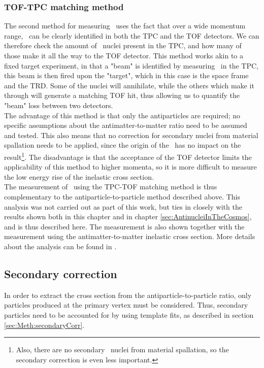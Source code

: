 \subsubsection{TOF-TPC matching method}\label{sec:TOFTPCMethod}
The second method for measuring \sigmainel\ uses the fact that over a wide momentum range, \ahe\ can be clearly identified in both the TPC and the TOF detectors. We can therefore check the amount of \ahe\ nuclei present in the TPC, and how many of those make it all the way to the TOF detector. This method works akin to a fixed target experiment, in that a "beam" is identified by measuring \ahe\ in the TPC, this beam is then fired upon the "target", which in this case is the space frame and the TRD. Some of the nuclei will annihilate, while the others which make it through will generate a matching TOF hit, thus allowing us to quantify the "beam" loss between two detectors. \\
The advantage of this method is that only the antiparticles are required; no specific assumptions about the antimatter-to-matter ratio need to be assumed and tested. This also means that no correction for secondary nuclei from material spallation needs to be applied, since the origin of the \ahe\ has no impact on the result\footnote{Also, there are no secondary \ahe\ nuclei from material spallation, so the secondary correction is even less important.}. The disadvantage is that the acceptance of the TOF detector limits the applicability of this method to higher momenta, so it is more difficult to measure the low energy rise of the inelastic cross section. \\

The measurement of \sigmainel\ using the TPC-TOF matching method is thus complementary to the antiparticle-to-particle method described above. This analysis was not carried out as part of this work, but ties in closely with the results shown both in this chapter and in chapter \ref{sec:AntinucleiInTheCosmos}, and is thus described here. The measurement is also shown together with the measurement using the antimatter-to-matter inelastic cross section. More details about the analysis can be found in \cite{PavelAN, antiHe3XS}.

\subsection{Secondary correction}
In order to extract the cross section from the antiparticle-to-particle ratio, only particles produced at the primary vertex must be considered. Thus, secondary particles need to be accounted for by using template fits, as described in section \ref{sec:Meth:secondaryCorr}. \\

